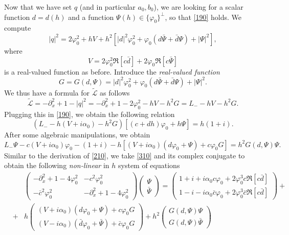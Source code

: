 \documentclass[12pt]{amsart}
\theoremstyle{definition}
\theoremstyle{remark}
\numberwithin{equation}{section}
\renewcommand{\(}{\left(}
\renewcommand{\)}{\right)}
\renewcommand{\[}{\left[}
\renewcommand{\]}{\right]}
\newcommand{\cl}{{\mathcal L}}
\newcommand{\al}{\alpha}
\newcommand{\vp}{\varphi}
\newcommand{\tcl}{\tilde{\cl}}
\newcommand{\p}{\partial}
\begin{document}
Now that we have set $q$ (and in particular $a_0, b_0$), we are looking for a scalar function $d=d(h)$ and a function $\Psi(h)\in \{\vp_0\}^\perp$, so that \eqref{190} holds. We compute
$$
|q|^2=2\vp_0^2 +h V+h^2[|d|^2\vp_0^2+\vp_0(d \bar{\Psi}+\bar{d} \Psi) +|\Psi|^2],
$$
 where
 $$
 V= 2  \vp_0^2 \Re[c\bar{d}]+2 \vp_0\Re[c \bar{\Psi}]
 $$
  is a real-valued function as
  before. Introduce the {\it real-valued function}
 $$
 G=G(d, \Psi)=|d|^2\vp_0^2+\vp_0(d \bar{\Psi}+\bar{d} \Psi) +|\Psi|^2.
 $$
 We thus have a formula for $\tcl$ as follows
 $$
 \tcl=-\p_x^2+1- |q|^2= -\p_x^2+1-2\vp_0^2 - h V - h^2 G=L_- - h V -h^2 G.
 $$
 Plugging this in \eqref{190}, we obtain the following relation
 \begin{equation}
 \label{300}
 (L_- - h(V+i\al_0)-h^2 G)[(c+d h)\vp_0+h \Psi]=h(1+i).
 \end{equation}
 After some algebraic manipulations,  we obtain
  \begin{equation}
  \label{310}
  L_- \Psi-c(V+i \al_0)\vp_0-(1+i)-h[(V+i\al_0)(d \vp_0 +\Psi)+c \vp_0 G]=h^2 G(d, \Psi)\Psi.
  \end{equation}
 Similar to the derivation of \eqref{210}, we take \eqref{310} and its complex conjugate to obtain the following {\it non-linear} in $h$ system of equations
  \begin{eqnarray*}
  & & \left(\begin{array}{cc}
  -\p_x^2+1- 4\vp_0^2 & -c^2 \vp_0^2 \\
  -\bar{c}^2 \vp_0^2 & -\p_x^2+1- 4\vp_0^2
  \end{array}\right) \left(\begin{array}{c}
  \Psi \\ \bar{\Psi}
  \end{array}\right) =  \left(\begin{array}{c}
  1+i +i \al_0 c \vp_0 +2 \vp_0^3 c   \Re[c\bar{d}] \\  1-i -i \al_0 \bar{c} \vp_0 + 2 \vp_0^3 \bar{c}   \Re[c\bar{d}]
  \end{array}\right)+ \\
  &+& h \left(\begin{array}{c}
  	 (V+i\al_0)(d\vp_0 +\Psi)+c \vp_0 G \\
  	 (V-i\al_0)(\bar{d} \vp_0 +\bar{\Psi})+\bar{c}\vp_0 G
  \end{array}\right)+h^2 \left(\begin{array}{c}
   G(d, \Psi)\Psi \\G(d, \Psi)\bar{\Psi}
\end{array}\right)
  \end{eqnarray*}
\end{document}
